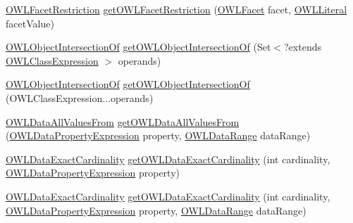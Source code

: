 \begin{DoxyCompactItemize}
\item 
\hyperlink{interfaceorg_1_1semanticweb_1_1owlapi_1_1model_1_1_o_w_l_facet_restriction}{O\-W\-L\-Facet\-Restriction} \hyperlink{classuk_1_1ac_1_1manchester_1_1cs_1_1owl_1_1owlapi_1_1_o_w_l_data_factory_impl_a54ad27e115312e245e37ba9d81577e41}{get\-O\-W\-L\-Facet\-Restriction} (\hyperlink{enumorg_1_1semanticweb_1_1owlapi_1_1vocab_1_1_o_w_l_facet}{O\-W\-L\-Facet} facet, \hyperlink{interfaceorg_1_1semanticweb_1_1owlapi_1_1model_1_1_o_w_l_literal}{O\-W\-L\-Literal} facet\-Value)
\item 
\hyperlink{interfaceorg_1_1semanticweb_1_1owlapi_1_1model_1_1_o_w_l_object_intersection_of}{O\-W\-L\-Object\-Intersection\-Of} \hyperlink{classuk_1_1ac_1_1manchester_1_1cs_1_1owl_1_1owlapi_1_1_o_w_l_data_factory_impl_a1bae2556a13c65f99dd0a4aaa1364365}{get\-O\-W\-L\-Object\-Intersection\-Of} (Set$<$?extends \hyperlink{interfaceorg_1_1semanticweb_1_1owlapi_1_1model_1_1_o_w_l_class_expression}{O\-W\-L\-Class\-Expression} $>$ operands)
\item 
\hyperlink{interfaceorg_1_1semanticweb_1_1owlapi_1_1model_1_1_o_w_l_object_intersection_of}{O\-W\-L\-Object\-Intersection\-Of} \hyperlink{classuk_1_1ac_1_1manchester_1_1cs_1_1owl_1_1owlapi_1_1_o_w_l_data_factory_impl_a7207c1abb649924ef1a47f852c121da9}{get\-O\-W\-L\-Object\-Intersection\-Of} (O\-W\-L\-Class\-Expression...\-operands)
\item 
\hyperlink{interfaceorg_1_1semanticweb_1_1owlapi_1_1model_1_1_o_w_l_data_all_values_from}{O\-W\-L\-Data\-All\-Values\-From} \hyperlink{classuk_1_1ac_1_1manchester_1_1cs_1_1owl_1_1owlapi_1_1_o_w_l_data_factory_impl_ae0f22d4bf44a86602ce4071833c86535}{get\-O\-W\-L\-Data\-All\-Values\-From} (\hyperlink{interfaceorg_1_1semanticweb_1_1owlapi_1_1model_1_1_o_w_l_data_property_expression}{O\-W\-L\-Data\-Property\-Expression} property, \hyperlink{interfaceorg_1_1semanticweb_1_1owlapi_1_1model_1_1_o_w_l_data_range}{O\-W\-L\-Data\-Range} data\-Range)
\item 
\hyperlink{interfaceorg_1_1semanticweb_1_1owlapi_1_1model_1_1_o_w_l_data_exact_cardinality}{O\-W\-L\-Data\-Exact\-Cardinality} \hyperlink{classuk_1_1ac_1_1manchester_1_1cs_1_1owl_1_1owlapi_1_1_o_w_l_data_factory_impl_a3c23c798e903f2fd6dc46d3c02ccc4bd}{get\-O\-W\-L\-Data\-Exact\-Cardinality} (int cardinality, \hyperlink{interfaceorg_1_1semanticweb_1_1owlapi_1_1model_1_1_o_w_l_data_property_expression}{O\-W\-L\-Data\-Property\-Expression} property)
\item 
\hyperlink{interfaceorg_1_1semanticweb_1_1owlapi_1_1model_1_1_o_w_l_data_exact_cardinality}{O\-W\-L\-Data\-Exact\-Cardinality} \hyperlink{classuk_1_1ac_1_1manchester_1_1cs_1_1owl_1_1owlapi_1_1_o_w_l_data_factory_impl_a7848bafb748bbc53a193ce1b2daccb15}{get\-O\-W\-L\-Data\-Exact\-Cardinality} (int cardinality, \hyperlink{interfaceorg_1_1semanticweb_1_1owlapi_1_1model_1_1_o_w_l_data_property_expression}{O\-W\-L\-Data\-Property\-Expression} property, \hyperlink{interfaceorg_1_1semanticweb_1_1owlapi_1_1model_1_1_o_w_l_data_range}{O\-W\-L\-Data\-Range} data\-Range)

\end{DoxyCompactItemize}
